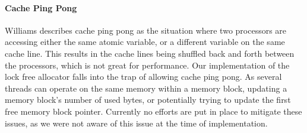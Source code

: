 \paragraph{Cache Ping Pong}
\label{par:detailed_lock_free_ping_pong}
Williams\cite{williams_safety_off} describes cache ping pong as the situation where two processors
are accessing either the same atomic variable, or a different variable on the same cache line.
This results in the cache lines being shuffled back and forth between the processors, which is not great for performance.
Our implementation of the lock free allocator falls into the trap of allowing cache ping pong.
As several threads can operate on the same memory within a memory block, updating a memory block's number of used bytes, or
potentially trying to update the first free memory block pointer.
Currently no efforts are put in place to mitigate these issues, as we were not aware of this issue at the time of implementation.

